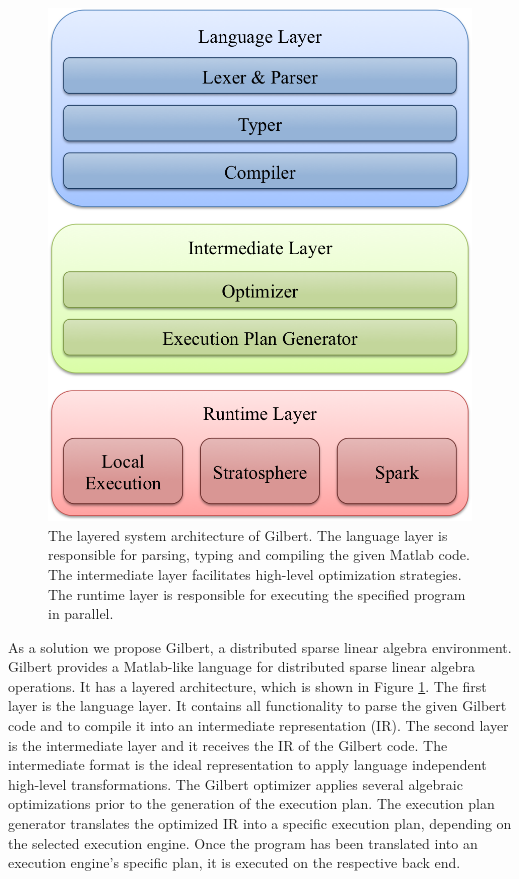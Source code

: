 \begin{figure}[t!]
\centering
\includegraphics[height=0.175\paperheight]{images/systemArchitecture.png}
\caption{The layered system architecture of Gilbert. The language layer is responsible for parsing, typing and compiling the given Matlab code. The intermediate layer facilitates high-level optimization strategies. The runtime layer is responsible for executing the specified program in parallel.}
\label{fig:systemArchitecture}
\end{figure}

As a solution we propose Gilbert, a distributed sparse linear algebra environment. Gilbert provides a Matlab-like language for distributed sparse linear algebra operations. It has a layered architecture, which is shown in Figure \ref{fig:systemArchitecture}. The first layer is the language layer. It contains all functionality to parse the given Gilbert code and to compile it into an intermediate representation (IR). The second layer is the intermediate layer and it receives the IR of the Gilbert code. The intermediate format is the ideal representation to apply language independent high-level transformations. The Gilbert optimizer applies several algebraic optimizations prior to the generation of the execution plan. The execution plan generator translates the optimized IR into a specific execution plan, depending on the selected execution engine. Once the program has been translated into an execution engine's specific plan, it is executed on the respective back end. 

